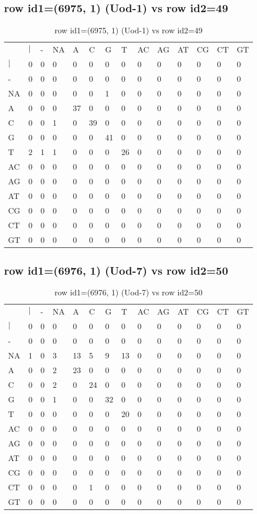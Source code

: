 \subsection{row id1=(6975, 1) (Uod-1) vs row id2=49}
\begin{center}
\begin{longtable}{|l|l|l|l|l|l|l|l|l|l|l|l|l|l|}
\caption{row id1=(6975, 1) (Uod-1) vs row id2=49} \label{table_dm192}\\
\hline
\\
\hline
&$|$&-&NA&A&C&G&T&AC&AG&AT&CG&CT&GT\\
$|$&0&0&0&0&0&0&0&0&0&0&0&0&0\\
-&0&0&0&0&0&0&0&0&0&0&0&0&0\\
NA&0&0&0&0&0&1&0&0&0&0&0&0&0\\
A&0&0&0&37&0&0&0&0&0&0&0&0&0\\
C&0&0&1&0&39&0&0&0&0&0&0&0&0\\
G&0&0&0&0&0&41&0&0&0&0&0&0&0\\
T&2&1&1&0&0&0&26&0&0&0&0&0&0\\
AC&0&0&0&0&0&0&0&0&0&0&0&0&0\\
AG&0&0&0&0&0&0&0&0&0&0&0&0&0\\
AT&0&0&0&0&0&0&0&0&0&0&0&0&0\\
CG&0&0&0&0&0&0&0&0&0&0&0&0&0\\
CT&0&0&0&0&0&0&0&0&0&0&0&0&0\\
GT&0&0&0&0&0&0&0&0&0&0&0&0&0\\
\hline
\end{longtable}
\end{center}

\subsection{row id1=(6976, 1) (Uod-7) vs row id2=50}
\begin{center}
\begin{longtable}{|l|l|l|l|l|l|l|l|l|l|l|l|l|l|}
\caption{row id1=(6976, 1) (Uod-7) vs row id2=50} \label{table_dm194}\\
\hline
\\
\hline
&$|$&-&NA&A&C&G&T&AC&AG&AT&CG&CT&GT\\
$|$&0&0&0&0&0&0&0&0&0&0&0&0&0\\
-&0&0&0&0&0&0&0&0&0&0&0&0&0\\
NA&1&0&3&13&5&9&13&0&0&0&0&0&0\\
A&0&0&2&23&0&0&0&0&0&0&0&0&0\\
C&0&0&2&0&24&0&0&0&0&0&0&0&0\\
G&0&0&1&0&0&32&0&0&0&0&0&0&0\\
T&0&0&0&0&0&0&20&0&0&0&0&0&0\\
AC&0&0&0&0&0&0&0&0&0&0&0&0&0\\
AG&0&0&0&0&0&0&0&0&0&0&0&0&0\\
AT&0&0&0&0&0&0&0&0&0&0&0&0&0\\
CG&0&0&0&0&0&0&0&0&0&0&0&0&0\\
CT&0&0&0&0&1&0&0&0&0&0&0&0&0\\
GT&0&0&0&0&0&0&0&0&0&0&0&0&0\\
\hline
\end{longtable}
\end{center}

